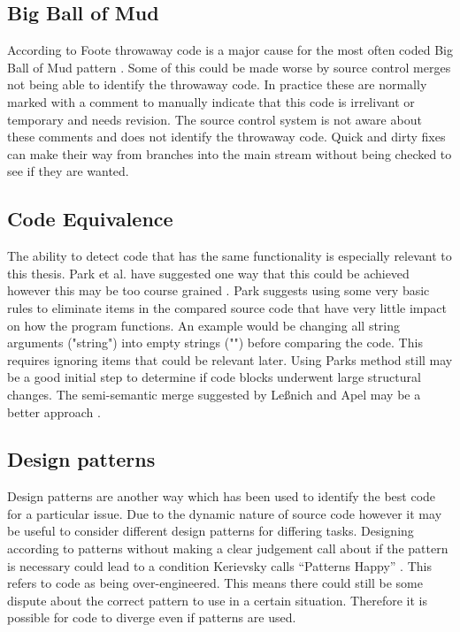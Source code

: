 \documentclass[12pt]{CRPITStyle}
\renewcommand{\cite}{\citep}
\begin{document}
\subsection{Big Ball of Mud}
According to Foote throwaway code is a major cause for the most often coded Big Ball of Mud pattern \cite{Foote1997}. Some of this could be made worse by source control merges not being able to identify the throwaway code. In practice these are normally marked with a comment to manually indicate that this code is irrelivant or temporary and needs revision. The source control system is not aware about these comments and does not identify the throwaway code. Quick and dirty fixes can make their way from branches into the main stream without being checked to see if they are wanted.
\subsection{Code Equivalence}
The ability to detect code that has the same functionality is especially relevant to this thesis. Park et al. have suggested one way that this could be achieved however this may be too course grained \cite{Park2013}. Park suggests using some very basic rules to eliminate items in the compared source code that have very little impact on how the program functions. An example would be changing all string arguments ("string") into empty strings ("") before comparing the code. This requires ignoring items that could be relevant later. Using Parks method still may be a good initial step to determine if code blocks underwent large structural changes. The semi-semantic merge suggested by Le{\ss}nich and Apel may be a better approach \cite{LeBenich2012} \cite{Apel2011}.
\subsection{Design patterns}
Design patterns are another way which has been used to identify the best code for a particular issue. Due to the dynamic nature of source code however it may be useful to consider different design patterns for differing tasks. Designing according to patterns without making a clear judgement call about if the pattern is necessary could lead to a condition Kerievsky calls ``Patterns Happy'' \cite{Kerievsky2004}. This refers to code as being over-engineered. This means there could still be some dispute about the correct pattern to use in a certain situation. Therefore it is possible for code to diverge even if patterns are used.
\end{document}
